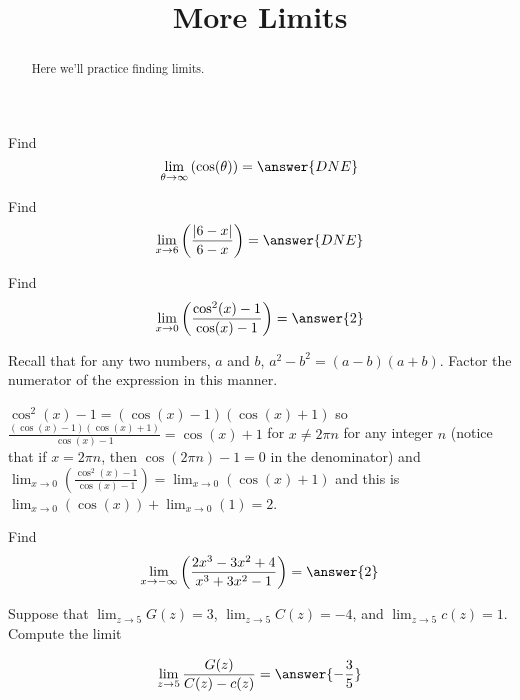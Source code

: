 \documentclass[handout]{ximera}
\title{More Limits}
\begin{document}
\begin{abstract}
  Here we'll practice finding limits.
\end{abstract}
\maketitle

\begin{exercise}
Find
\[
\lim_{\theta\to\infty}\left(\cos(\theta)\right)
= \answer{DNE}
\]

\end{exercise}


\begin{exercise}
Find
\[
\lim_{x\to6}\left(\frac{\left|6-x\right|}{6-x}\right)
= \answer{DNE}
\]

\end{exercise}

\begin{exercise}
Find
\[
\lim_{x\to0}\left(\frac{\cos^{2}(x)-1}{\cos(x)-1}\right)
= \answer{2}
\]

\begin{hint}
Recall that for any two numbers, $a$ and $b$,  $a^2-b^2=(a-b)(a+b)$. Factor the numerator of the expression in this manner.
\end{hint}
\begin{hint}
$\cos^{2}(x)-1=(\cos(x)-1)(\cos(x)+1)$ so $\frac{(\cos(x)-1)(\cos(x)+1)}{\cos(x)-1}=\cos(x)+1$ for $x\ne2\pi{n}$ for any integer $n$ (notice that if $x=2\pi n$, then $\cos(2\pi n)-1=0$ in the denominator) and $\lim_{x\to0}\left(\frac{\cos^{2}(x)-1}{\cos(x)-1}\right)=\lim_{x\to0}\left(\cos(x)+1\right)$ and this is $\lim_{x\to0}\left(\cos(x)\right)+\lim_{x\to0}\left(1\right)=2$.

\end{hint}
\end{exercise}

\begin{exercise}
Find
\[
\lim_{x\to-\infty}\left(\frac{2x^3-3x^2+4}{x^3+3x^2-1}\right)
= \answer{2}
\]

\end{exercise}


\begin{exercise}
Suppose that $\lim_{z\to5}G(z)=3$, $\lim_{z\to5}C(z)=-4$, and $\lim_{z\to5}c(z)=1$. Compute the limit

\[
\lim_{z\to 5 } \frac{G(z)}{C(z)-c(z)} = \answer{-\frac{3}{5}}
\]
\end{exercise}
\end{document}

